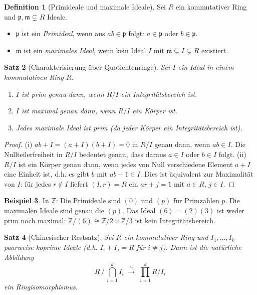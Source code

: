 \documentclass[12pt,a4paper]{amsart}
\newtheorem{theorem}{Satz}[section]
\theoremstyle{definition}
\newtheorem{definition}[theorem]{Definition}
\newtheorem{example}[theorem]{Beispiel}
\theoremstyle{definition}
\begin{document}
\begin{definition}[Primideale und maximale Ideale]
Sei $R$ ein kommutativer Ring und $\mathfrak{p}, \mathfrak{m} \subsetneq R$ Ideale.
\begin{itemize}
  \item $\mathfrak{p}$ ist ein \emph{Primideal}, wenn aus $ab \in \mathfrak{p}$ folgt:
        $a \in \mathfrak{p}$ oder $b \in \mathfrak{p}$.
  \item $\mathfrak{m}$ ist ein \emph{maximales Ideal}, wenn kein Ideal $I$ mit
        $\mathfrak{m} \subsetneq I \subsetneq R$ existiert.
\end{itemize}
\end{definition}

\begin{theorem}[Charakterisierung über Quotientenringe]
Sei $I$ ein Ideal in einem kommutativen Ring $R$.
\begin{enumerate}[label=(\roman*)]
  \item $I$ ist prim genau dann, wenn $R/I$ ein Integritätsbereich ist.
  \item $I$ ist maximal genau dann, wenn $R/I$ ein Körper ist.
  \item Jedes maximale Ideal ist prim (da jeder Körper ein Integritätsbereich ist).
\end{enumerate}
\end{theorem}

\begin{proof}
(i) $ab + I = (a+I)(b+I) = 0$ in $R/I$ genau dann, wenn $ab \in I$. Die Nullteilerfreiheit
in $R/I$ bedeutet genau, dass daraus $a \in I$ oder $b \in I$ folgt.
(ii) $R/I$ ist ein Körper genau dann, wenn jedes von Null verschiedene Element
$a + I$ eine Einheit ist, d.h. es gibt $b$ mit $ab - 1 \in I$. Dies ist äquivalent
zur Maximalität von $I$: für jedes $r \notin I$ liefert $(I,r) = R$ ein $ar + j = 1$
mit $a \in R$, $j \in I$.
\end{proof}

\begin{example}\label{bsp:ideale-Z}
In $\mathbb{Z}$: Die Primideale sind $(0)$ und $(p)$ für Primzahlen $p$.
Die maximalen Ideale sind genau die $(p)$. Das Ideal $(6) = (2)(3)$ ist weder prim
noch maximal: $\mathbb{Z}/(6) \cong \mathbb{Z}/2 \times \mathbb{Z}/3$ ist kein
Integritätsbereich.
\end{example}

\begin{theorem}[Chinesischer Restsatz]\label{satz:crt}
Sei $R$ ein kommutativer Ring und $I_1,\ldots,I_k$ paarweise koprime Ideale
(d.h. $I_i + I_j = R$ für $i \neq j$). Dann ist die natürliche Abbildung
\[
  R \,\Big/\, \bigcap_{i=1}^k I_i \;\xrightarrow{\;\sim\;}\; \prod_{i=1}^k R/I_i
\]
ein Ringisomorphismus.
\end{theorem}
\end{document}
